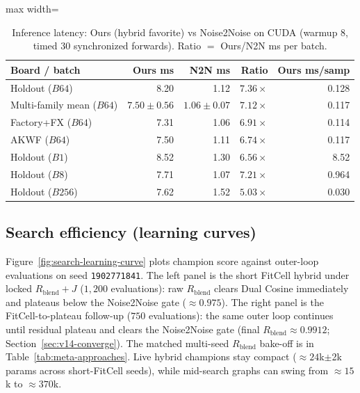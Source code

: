 \begin{table}[htbp]
  \centering
  \caption{Inference latency: Ours (hybrid favorite) vs Noise2Noise on CUDA
    (warmup 8, timed 30 synchronized forwards).
    Ratio $=$ Ours/N2N ms per batch.}
  \label{tab:ours-n2n-latency}
  \footnotesize
  \setlength{\tabcolsep}{3pt}
  \begin{adjustbox}{max width=\columnwidth}
\begin{tabular}{@{}lrrrr@{}}
    \toprule
    Board / batch & Ours ms & N2N ms & Ratio & Ours ms/samp \\
    \midrule
    Holdout ($B64$) & 8.20 & 1.12 & $7.36\times$ & 0.128 \\
    Multi-family mean ($B64$) & $7.50{\pm}0.56$ & $1.06{\pm}0.07$ & $7.12\times$ & 0.117 \\
    Factory+FX ($B64$) & 7.31 & 1.06 & $6.91\times$ & 0.114 \\
    AKWF ($B64$) & 7.50 & 1.11 & $6.74\times$ & 0.117 \\
    \midrule
    Holdout ($B1$) & 8.52 & 1.30 & $6.56\times$ & 8.52 \\
    Holdout ($B8$) & 7.71 & 1.07 & $7.21\times$ & 0.964 \\
    Holdout ($B256$) & 7.62 & 1.52 & $5.03\times$ & 0.030 \\
    \bottomrule
  \end{tabular}
\end{adjustbox}
\end{table}

\subsection{Search efficiency (learning curves)}
\label{sec:search-learning-curve}

Figure~\ref{fig:search-learning-curve} plots champion score against outer-loop evaluations
on seed \texttt{1902771841}.
The left panel is the short FitCell hybrid under locked $R_{\mathrm{blend}}{+}J$ ($1{,}200$ evaluations):
raw $R_{\mathrm{blend}}$ clears Dual Cosine immediately and plateaus below the Noise2Noise gate (${\approx}0.975$).
The right panel is the FitCell-to-plateau follow-up ($750$ evaluations):
the same outer loop continues until residual plateau and clears the Noise2Noise gate
(final $R_{\mathrm{blend}}{\approx}0.9912$; Section~\ref{sec:v14-converge}).
The matched multi-seed $R_{\mathrm{blend}}$ bake-off is in Table~\ref{tab:meta-approaches}.
Live hybrid champions stay compact (${\approx}24$k$\pm$2k params across short-FitCell seeds), while mid-search graphs can swing from ${\approx}15$k to ${\approx}370$k.

